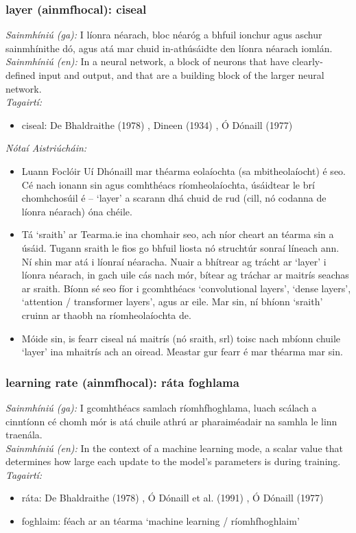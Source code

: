 \subsubsection*{layer (ainmfhocal): ciseal}
 \noindent \textit{Sainmhíniú (ga):} I líonra néarach, bloc néaróg a bhfuil ionchur agus aschur sainmhínithe dó, agus atá mar chuid in-athúsáidte den líonra néarach iomlán.
\\
 \noindent \textit{Sainmhíniú (en):} In a neural network, a block of neurons that have clearly-defined input and output, and that are a building block of the larger neural network.
\\
 \noindent \textit{Tagairtí:}
\begin{itemize}
	\item ciseal: De Bhaldraithe (1978) \cite{de-bhaldraithe}, Dineen (1934) \cite{dineen}, Ó Dónaill (1977) \cite{odonaill}
\end{itemize}

 \noindent \textit{Nótaí Aistriúcháin:}
\begin{itemize}
	\item Luann Foclóir Uí Dhónaill mar théarma eolaíochta (sa mbitheolaíocht) é seo. Cé nach ionann sin agus comhthéacs ríomheolaíochta, úsáidtear le brí chomhchosúil é -- `layer' a scarann dhá chuid de rud (cill, nó codanna de líonra néarach) óna chéile.
	\item Tá `sraith' ar Tearma.ie ina chomhair seo, ach níor cheart an téarma sin a úsáid. Tugann sraith le fios go bhfuil liosta nó struchtúr sonraí líneach ann. Ní shin mar atá i líonraí néaracha. Nuair a bhítrear ag trácht ar `layer' i líonra néarach, in gach uile cás nach mór, bítear ag tráchar ar maitrís seachas ar sraith. Bíonn sé seo fíor i gcomhthéacs `convolutional layers', `dense layers', `attention / transformer layers', agus ar eile. Mar sin, ní bhíonn `sraith' cruinn ar thaobh na ríomheolaíochta de.
	\item Móide sin, is fearr ciseal ná maitrís (nó sraith, srl) toisc nach mbíonn chuile `layer' ina mhaitrís ach an oiread. Meastar gur fearr é mar théarma mar sin.
\end{itemize}


\subsubsection*{learning rate (ainmfhocal): ráta foghlama}
 \noindent \textit{Sainmhíniú (ga):} I gcomhthéacs samlach ríomhfhoghlama, luach scálach a cinntíonn cé chomh mór is atá chuile athrú ar pharaiméadair na samhla le linn traenála.
\\
 \noindent \textit{Sainmhíniú (en):} In the context of a machine learning mode, a scalar value that determines how large each update to the model's parameters is during training.
\\
 \noindent \textit{Tagairtí:}
\begin{itemize}
	\item ráta: De Bhaldraithe (1978) \cite{de-bhaldraithe}, Ó Dónaill et al. (1991) \cite{focloir-beag}, Ó Dónaill (1977) \cite{odonaill}
	\item foghlaim: féach ar an téarma `machine learning / ríomhfhoghlaim'
\end{itemize}

